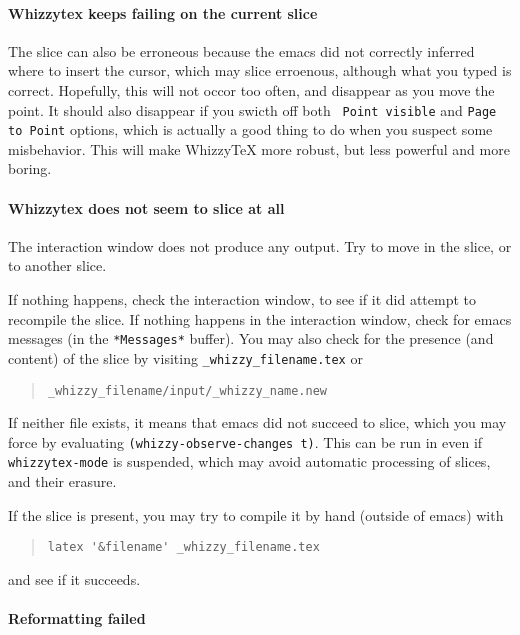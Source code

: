 \documentclass{article}
\let \lst \verb
\begin{document}
\paragraph {Whizzytex keeps failing on the current slice}

The slice can also be erroneous because the emacs did not correctly inferred
where to insert the cursor, which may slice erroenous, although what you
typed is correct. Hopefully, this will not occor too often, and disappear as
you move the point. It should also disappear if you swicth off both {\tt
Point visible} and {\tt Page to Point} options, which is actually a good
thing to do when you suspect some misbehavior.  This will make WhizzyTeX
more robust, but less powerful and more boring.

\paragraph {Whizzytex does not seem to slice at all}

The interaction window does not produce any output. 
Try to move in the slice, or to another slice. 

If nothing happens, check the interaction
window, to see if it did attempt to recompile the slice.
If nothing happens in the interaction window, check for emacs messages
(in the \lst"*Messages*" buffer). You may also check for the presence 
(and content) of the slice by visiting 
\lst"_whizzy_filename.tex" or
\begin{quote}
\begin{verbatim}
_whizzy_filename/input/_whizzy_name.new
\end{verbatim}
\end{quote}
If neither file exists, it means that emacs did
not succeed to slice, which you may force by evaluating
\lst"(whizzy-observe-changes t)". 
This can be run in even if {\tt whizzytex-mode} is suspended, which may
avoid automatic processing of slices, and their erasure.

If the slice is present, you may try to compile it by hand (outside of
emacs) with 
\begin{quote}
\begin{verbatim}
latex '&filename' _whizzy_filename.tex
\end{verbatim}
\end{quote}
and see if it succeeds. 


\paragraph {Reformatting failed}
\end{document}

